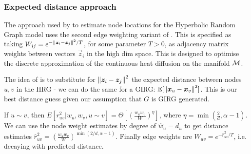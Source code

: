 \subsubsection{Expected distance approach}
The approach used by \cite{garcia2019mercator} to estimate node locations for the Hyperbolic Random Graph model uses the second  edge weighting variant of \cite{belkin2001laplacian}. This is specified as taking $W_{ij} = e^{-\left\lVert \bm{z}_i - \bm{z}_j\right\rVert^2 / T}$, for some parameter $T > 0$, as adjacency matrix weights between vectors $\vec{z}_i$ in the high dim space. This is designed to optimise the discrete approximation of the continuous heat diffusion on the manifold $\mathcal{M}$.

The idea of \cite{garcia2019mercator} is to substitute for $\left\lVert \bm{z}_i - \bm{z}_j\right\rVert^2$ the expected distance between nodes $u, v$ in the HRG - we can do the same for a GIRG: $\mathbb{E}[\left\lVert \bm{x}_u - \bm{x}_v\right\rVert^2]$. This is our best distance guess given our assumption that $G$ is GIRG generated.

If $u \sim v$, then  $E[r_{uv}^2 | w_u, w_v, u \sim v] = \Theta \left [ \left ( \frac{w_u w_v}{W} \right )^\eta \right ]$, where $\eta = \min (\frac{2}{d}, \alpha - 1)$.
We can use the node weight estimates by degree of $\hat{w}_u = d_u$ to get distance estimates $\hat{r}_{uv}^2 = \left ( \frac{w_u w_v}{W} \right )^{\min(2/d, \alpha - 1)}$. Finally edge weights are $W_{uv} = e^{-\hat{r}_{uv}^2 / T}$, i.e. decaying with predicted distance.



